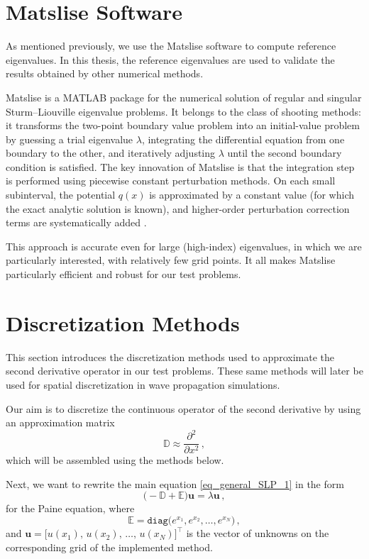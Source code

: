 \documentclass[11pt,a4paper,oneside,openright]{report} %
\begin{document}
\section{Matslise Software}
\noindent
As mentioned previously, we use the Matslise software \cite{matslise} to compute reference eigenvalues. In this thesis, the reference eigenvalues are used to validate the results obtained by other numerical methods.

Matslise is a MATLAB package for the numerical solution of regular and singular Sturm--Liouville eigenvalue problems. It belongs to the class of shooting methods: it transforms the two-point boundary value problem into an initial-value problem by guessing a trial eigenvalue $\lambda$, integrating the differential equation from one boundary to the other, and iteratively adjusting $\lambda$ until the second boundary condition is satisfied. The key innovation of Matslise is that the integration step is performed using piecewise constant perturbation methods. On each small subinterval, the potential $q(x)$ is approximated by a constant value (for which the exact analytic solution is known), and higher-order perturbation correction terms are systematically added \cite{ledoux}.

This approach is accurate even for large (high-index) eigenvalues, in which we are particularly interested, with relatively few grid points. It all makes Matslise particularly efficient and robust for our test problems.



\section{Discretization Methods}
\noindent
This section introduces the discretization methods used to approximate the second derivative operator in our test problems. These same methods will later be used for spatial discretization in wave propagation simulations.

Our aim is to discretize the continuous operator of the second derivative by using an approximation matrix
\begin{equation}
    \mathbb{D} \approx \dfrac{\partial^2}{\partial  x^2} \, ,
\end{equation}
which will be assembled using the methods below.

Next, we want to rewrite the main equation \eqref{eq_general_SLP_1} in the form
\begin{equation}\label{eq_Paine}
    \big( - \mathbb{D} + \mathbb{E}  \big) \boldsymbol{u} = \lambda \boldsymbol{u} \, ,
\end{equation}
for the Paine equation, where
\begin{equation}
    \mathbb{E} = \texttt{diag}\big(e^{x_1}, e^{x_2}, \dots, e^{x_N}\big) \, ,
\end{equation}
and $\boldsymbol{u} = \big[u(x_1), \, u(x_2), \, \dots, \, u(x_N)\big]^\top$ is the vector of unknowns on the corresponding grid of the implemented method.
\end{document}
